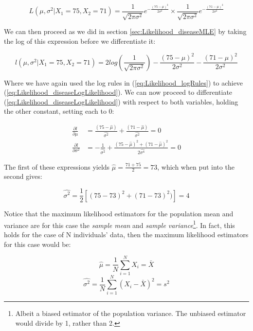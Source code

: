\documentclass[11pt,fullpage]{book}
\begin{document}
\begin{equation}\label{eq:Likelihood_normalTwo}
L(\mu,\sigma^2|X_1=75,X_2 =71) = \frac{1}{\sqrt{2\pi\sigma^2}}e^{-\frac{(75-\mu)^2}{2\sigma^2}}\times \frac{1}{\sqrt{2\pi\sigma^2}}e^{-\frac{(71-\mu)^2}{2\sigma^2}}
\end{equation}

We can then proceed as we did in section \ref{sec:Likelihood_diseaseMLE} by taking the log of this expression before we differentiate it:

\begin{equation}\label{eq:Likelihood_diseaseLogLikelihood}
l(\mu,\sigma^2|X_1=75,X_2 =71) = 2log\left(\frac{1}{\sqrt{2\pi\sigma^2}}\right)-{\frac{(75-\mu)^2}{2\sigma^2}}-{\frac{(71-\mu)^2}{2\sigma^2}}
\end{equation}

Where we have again used the log rules in (\ref{eq:Likelihood_logRules}) to achieve (\ref{eq:Likelihood_diseaseLogLikelihood}). We can now proceed to differentiate (\ref{eq:Likelihood_diseaseLogLikelihood}) with respect to both variables, holding the other constant, setting each to 0:

\begin{equation}\label{eq:Likelihood_diseaseDerivativeOne}
\begin{align}
\frac{\partial l}{\partial \mu} &= {\frac{(75-\hat{\mu})}{\hat{\sigma^2}}}+{\frac{(71-\hat{\mu})}{\hat{\sigma^2}}} = 0\\
\frac{\partial l}{\partial \sigma^2} &= -\frac{1}{\hat{\sigma^2}} + \frac{(75-\hat{\mu})^2+(71-\hat{\mu})^2}{2\hat{\sigma^4}} = 0
\end{align}
\end{equation}

The first of these expressions yields $\hat{\mu} = \frac{71+75}{2} = 73$, which when put into the second gives: 

\begin{equation}
\hat{\sigma^2} = \frac{1}{2}\left[(75-73)^2 + (71-73)^2)\right] = 4
\end{equation}

Notice that the maximum likelihood estimators for the population mean and variance are for this case the \textit{sample mean} and \textit{sample variance}\footnote{Albeit a biased estimator of the population variance. The unbiased estimator would divide by 1, rather than 2.}. In fact, this holds for the case of N individuals' data, then the maximum likelihood estimators for this case would be:

\begin{equation}
\hat{\mu} = \frac{1}{N}\sum\limits_{i=1}^{N} X_i = \bar{X}
\end{equation}
\begin{equation}
\hat{\sigma^2} = \frac{1}{N}\sum\limits_{i=1}^{N}(X_i-\bar{X})^2 = s^2
\end{equation}
\end{document}
